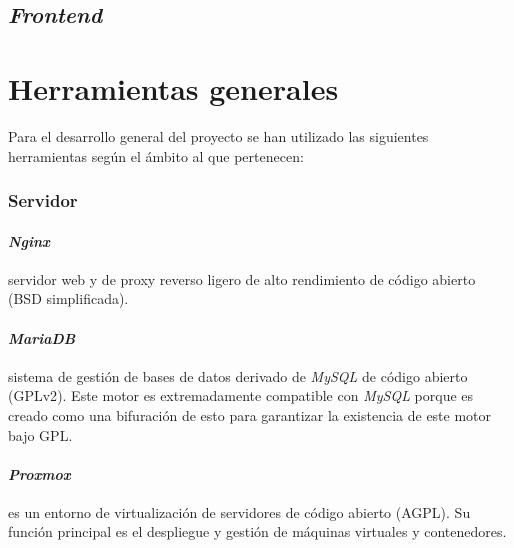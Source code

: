\subsection{\textit{Frontend}}

\section{Herramientas generales}

Para el desarrollo general del proyecto se han utilizado las siguientes herramientas según el ámbito al que pertenecen:

\subsubsection{Servidor}
\paragraph{\textit{Nginx}}servidor web y de proxy reverso ligero de alto rendimiento\cite{tool:nginx,wiki:nginx} de código abierto (BSD simplificada\cite{lic:bsd}).
\paragraph{\textit{MariaDB}}sistema de gestión de bases de datos derivado de \textit{MySQL}\cite{tool:mariadb,wiki:mariadb} de código abierto (GPLv2\cite{lic:gplv2}). Este motor es extremadamente compatible con \textit{MySQL} porque es creado como una bifuración de esto para garantizar la existencia de este motor bajo GPL.
\paragraph{\textit{Proxmox}}es un entorno de virtualización de servidores\cite{tool:proxmox,wiki:proxmox} de código abierto (AGPL\cite{lic:agpl}). Su función principal es el despliegue y gestión de máquinas virtuales y contenedores.
